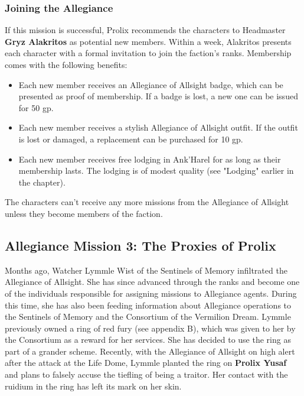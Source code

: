 \documentclass[10pt,a4,twoside,twocolumn,openany,nodeprecatedcode]{dndbook}
\begin{document}
\subsubsection{Joining the Allegiance}
If this mission is successful, Prolix recommends the characters to Headmaster \textbf{Gryz Alakritos} as potential new members. Within a week, Alakritos presents each character with a formal invitation to join the faction's ranks. Membership comes with the following benefits:
\begin{itemize}

\item Each new member receives an Allegiance of Allsight badge, which can be presented as proof of membership. If a badge is lost, a new one can be issued for 50 gp.
\item Each new member receives a stylish Allegiance of Allsight outfit. If the outfit is lost or damaged, a replacement can be purchased for 10 gp.
\item Each new member receives free lodging in Ank'Harel for as long as their membership lasts. The lodging is of modest quality (see "Lodging" earlier in the chapter).
\end{itemize}


The characters can't receive any more missions from the Allegiance of Allsight unless they become members of the faction.
\subsection{Allegiance Mission 3: The Proxies of Prolix}
Months ago, Watcher Lymmle Wist of the Sentinels of Memory infiltrated the Allegiance of Allsight. She has since advanced through the ranks and become one of the individuals responsible for assigning missions to Allegiance agents. During this time, she has also been feeding information about Allegiance operations to the Sentinels of Memory and the Consortium of the Vermilion Dream.
Lymmle previously owned a ring of red fury (see appendix B), which was given to her by the Consortium as a reward for her services. She has decided to use the ring as part of a grander scheme. Recently, with the Allegiance of Allsight on high alert after the attack at the Life Dome, Lymmle planted the ring on \textbf{Prolix Yusaf} and plans to falsely accuse the tiefling of being a traitor. Her contact with the ruidium in the ring has left its mark on her skin.
\end{document}
